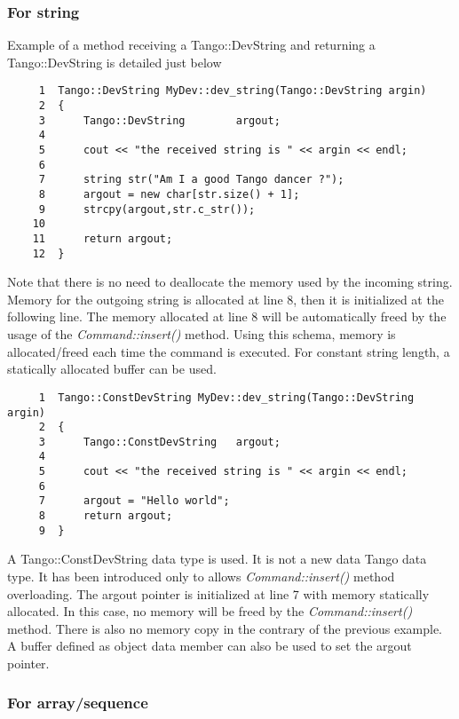 \subsubsection{For string}

Example of a method receiving a Tango::DevString
and returning a Tango::DevString is detailed just below


\begin{verbatim}
     1  Tango::DevString MyDev::dev_string(Tango::DevString argin)
     2  {
     3      Tango::DevString        argout;
     4  
     5      cout << "the received string is " << argin << endl;
     6          
     7      string str("Am I a good Tango dancer ?");
     8      argout = new char[str.size() + 1];
     9      strcpy(argout,str.c_str());
    10          
    11      return argout;
    12  }
\end{verbatim}


Note that there is no need to deallocate the memory used by the incoming
string. Memory for the outgoing string is allocated at line 8, then
it is initialized at the following line. The memory allocated at line
8 will be automatically freed by the usage of the \emph{Command::insert()}
method. Using this schema, memory is allocated/freed
each time the command is executed. For constant string length, a statically
allocated buffer can be used.


\begin{verbatim}
     1  Tango::ConstDevString MyDev::dev_string(Tango::DevString argin)
     2  {
     3      Tango::ConstDevString   argout;
     4  
     5      cout << "the received string is " << argin << endl;
     6          
     7      argout = "Hello world"; 
     8      return argout;
     9  }
\end{verbatim}


A Tango::ConstDevString data type is
used. It is not a new data Tango data type. It has been introduced
only to allows \emph{Command::insert()} method overloading. The argout
pointer is initialized at line 7 with memory statically allocated.
In this case, no memory will be freed by the \emph{Command::insert()}
method. There is also no memory copy in the contrary
of the previous example. A buffer defined as object data member can
also be used to set the argout pointer.


\subsubsection{For array/sequence}

